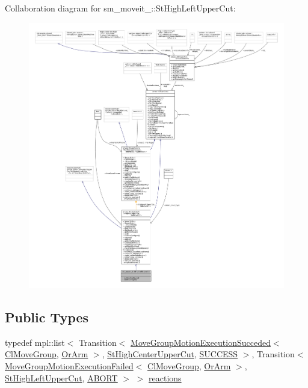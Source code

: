 Collaboration diagram for sm\+\_\+moveit\+\_\+:\+:St\+High\+Left\+Upper\+Cut\+:
\nopagebreak
\begin{figure}[H]
\begin{center}
\leavevmode
\includegraphics[width=350pt]{structsm__moveit__3_1_1StHighLeftUpperCut__coll__graph}
\end{center}
\end{figure}
\subsection*{Public Types}
\begin{DoxyCompactItemize}
\item 
typedef mpl\+::list$<$ Transition$<$ \hyperlink{structmoveit__z__client_1_1MoveGroupMotionExecutionSucceded}{Move\+Group\+Motion\+Execution\+Succeded}$<$ \hyperlink{classmoveit__z__client_1_1ClMoveGroup}{Cl\+Move\+Group}, \hyperlink{classsm__moveit__3_1_1OrArm}{Or\+Arm} $>$, \hyperlink{structsm__moveit__3_1_1StHighCenterUpperCut}{St\+High\+Center\+Upper\+Cut}, \hyperlink{classSUCCESS}{S\+U\+C\+C\+E\+SS} $>$, Transition$<$ \hyperlink{structmoveit__z__client_1_1MoveGroupMotionExecutionFailed}{Move\+Group\+Motion\+Execution\+Failed}$<$ \hyperlink{classmoveit__z__client_1_1ClMoveGroup}{Cl\+Move\+Group}, \hyperlink{classsm__moveit__3_1_1OrArm}{Or\+Arm} $>$, \hyperlink{structsm__moveit__3_1_1StHighLeftUpperCut}{St\+High\+Left\+Upper\+Cut}, \hyperlink{classABORT}{A\+B\+O\+RT} $>$ $>$ \hyperlink{structsm__moveit__3_1_1StHighLeftUpperCut_a26a27ee4a7e89a86f60919e51ef9a51b}{reactions}
\end{DoxyCompactItemize}
